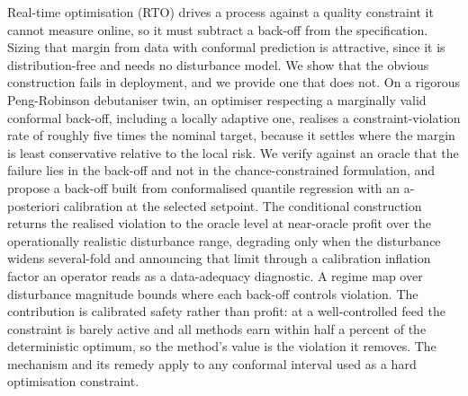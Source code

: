 Real-time optimisation (RTO) drives a process against a quality constraint it cannot measure
online, so it must subtract a back-off from the specification. Sizing that margin from data
with conformal prediction is attractive, since it is distribution-free and needs no
disturbance model. We show that the obvious construction fails in deployment, and
we provide one that does not. On a rigorous Peng-Robinson debutaniser twin, an optimiser
respecting a marginally valid conformal back-off, including a locally adaptive one, realises
a constraint-violation rate of roughly five times the nominal target, because it settles
where the margin is least conservative relative to the local risk. We verify against an
oracle that the failure lies in the back-off and not in the chance-constrained formulation,
and propose a back-off built from conformalised quantile regression with an a-posteriori
calibration at the selected setpoint. The conditional construction returns the realised
violation to the oracle level at near-oracle profit over the operationally realistic
disturbance range, degrading only when the disturbance widens several-fold and announcing
that limit through a calibration inflation factor an operator reads as a data-adequacy diagnostic. A regime map over disturbance magnitude bounds where each back-off controls
violation. The contribution is calibrated safety rather than profit: at a well-controlled
feed the constraint is barely active and all methods earn within half a percent of the
deterministic optimum, so the method's value is the violation it removes. The mechanism and
its remedy apply to any conformal interval used as a hard optimisation constraint.
